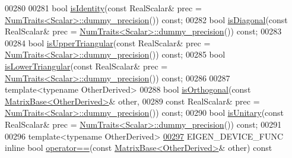 \begin{DoxyCode}
00280 
00281     \textcolor{keywordtype}{bool} \hyperlink{group___core___module_a4ccbd8dfa06e9d47b9bf84711f8b9d40}{isIdentity}(\textcolor{keyword}{const} RealScalar& prec = 
      \hyperlink{group___core___module_struct_eigen_1_1_num_traits}{NumTraits<Scalar>::dummy\_precision}()) \textcolor{keyword}{const};
00282     \textcolor{keywordtype}{bool} \hyperlink{group___core___module_a97027ea54c8cd1ddb1c578fee5cedc67}{isDiagonal}(\textcolor{keyword}{const} RealScalar& prec = 
      \hyperlink{group___core___module_struct_eigen_1_1_num_traits}{NumTraits<Scalar>::dummy\_precision}()) \textcolor{keyword}{const};
00283 
00284     \textcolor{keywordtype}{bool} \hyperlink{group___core___module_aae3ec1660bb4ac584220481c54ab4a64}{isUpperTriangular}(\textcolor{keyword}{const} RealScalar& prec = 
      \hyperlink{group___core___module_struct_eigen_1_1_num_traits}{NumTraits<Scalar>::dummy\_precision}()) \textcolor{keyword}{const};
00285     \textcolor{keywordtype}{bool} \hyperlink{group___core___module_a1e96c42d79a56f0a6ade30ce031e17eb}{isLowerTriangular}(\textcolor{keyword}{const} RealScalar& prec = 
      \hyperlink{group___core___module_struct_eigen_1_1_num_traits}{NumTraits<Scalar>::dummy\_precision}()) \textcolor{keyword}{const};
00286 
00287     \textcolor{keyword}{template}<\textcolor{keyword}{typename} OtherDerived>
00288     \textcolor{keywordtype}{bool} \hyperlink{group___core___module_aefdc8e4e4c156fdd79a21479e75dcd8a}{isOrthogonal}(\textcolor{keyword}{const} \hyperlink{group___core___module_class_eigen_1_1_matrix_base}{MatrixBase<OtherDerived>}& other,
00289                       \textcolor{keyword}{const} RealScalar& prec = 
      \hyperlink{group___core___module_struct_eigen_1_1_num_traits}{NumTraits<Scalar>::dummy\_precision}()) \textcolor{keyword}{const};
00290     \textcolor{keywordtype}{bool} \hyperlink{group___core___module_a8a7ee34ce202cac3eeea9cf20c9e4833}{isUnitary}(\textcolor{keyword}{const} RealScalar& prec = 
      \hyperlink{group___core___module_struct_eigen_1_1_num_traits}{NumTraits<Scalar>::dummy\_precision}()) \textcolor{keyword}{const};
00291 
00296     \textcolor{keyword}{template}<\textcolor{keyword}{typename} OtherDerived>
\hyperlink{group___core___module_a0f555511cb0f8ccbbb0e6c597c4cf412}{00297}     EIGEN\_DEVICE\_FUNC \textcolor{keyword}{inline} \textcolor{keywordtype}{bool} \hyperlink{group___core___module_a0f555511cb0f8ccbbb0e6c597c4cf412}{operator==}(\textcolor{keyword}{const} 
      \hyperlink{group___core___module_class_eigen_1_1_matrix_base}{MatrixBase<OtherDerived>}& other)\textcolor{keyword}{ const}

\end{DoxyCode}
